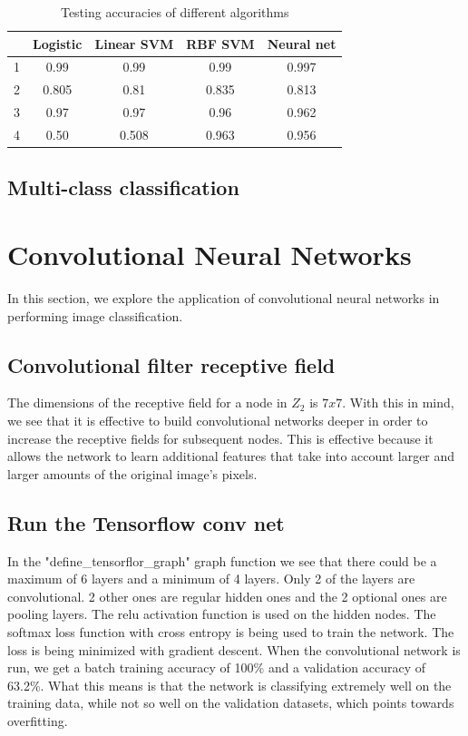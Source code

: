 \documentclass{article}
\begin{document}
\begin{table}
  \begin{center}
    \begin{tabular}{ | c | c | c | c | c | }
      \hline
          & Logistic   & Linear SVM   & RBF SVM    & Neural net \\ \hline
      1   & 0.99       & 0.99         & 0.99       & 0.997        \\ \hline
      2   & 0.805      & 0.81         & 0.835      & 0.813        \\ \hline
      3   & 0.97       & 0.97         & 0.96       & 0.962        \\ \hline
      4   & 0.50       & 0.508        & 0.963      & 0.956        \\ \hline
    \end{tabular}
  \end{center}
  \caption{Testing accuracies of different algorithms}
\end{table}





\subsection{Multi-class classification}



\section{Convolutional Neural Networks}
In this section, we explore the application of convolutional neural networks in performing image classification.

\subsection{Convolutional filter receptive field}
The dimensions of the receptive field for a node in $Z_2$ is $7 x 7$. With this in mind, we see that it is effective to build convolutional networks deeper in order to increase the receptive fields for subsequent nodes. This is effective because it allows the network to learn additional features that take into account larger and larger amounts of the original image's pixels.

\subsection{Run the Tensorflow conv net}
In the "define\_tensorflor\_graph" graph function we see that there could be a maximum of 6 layers and a minimum of 4 layers. Only 2 of the layers are convolutional. 2 other ones are regular hidden ones and the 2 optional ones are pooling layers. The relu activation function is used on the hidden nodes. The softmax loss function with cross entropy is being used to train the network. The loss is being minimized with gradient descent. When the convolutional network is run, we get a batch training accuracy of 100\% and a validation accuracy of 63.2\%. What this means is that the network is classifying extremely well on the training data, while not so well on the validation datasets, which points towards overfitting.
\end{document}
